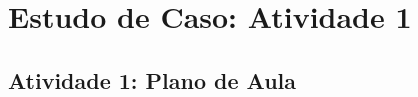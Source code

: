 \chapter{Estudo de Caso: Atividade 1} \label{Chap:AppendixLesson}

\section{Atividade 1: Plano de Aula}\label{section:atividade1_planoaula}




